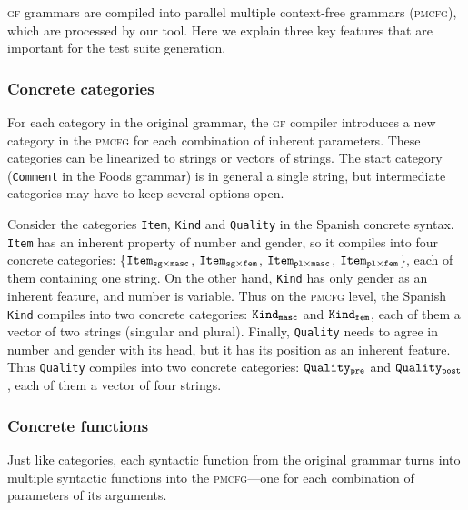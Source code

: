 \documentclass[runningheads]{llncs}
\def\t#1{\texttt{#1}}
\def\gf{\textsc{gf}}
\def\pmcfg{\textsc{pmcfg}}
\newcommand{\quality}[1]{${\tt Quality_{#1}}$}
\newcommand{\kind}[1]{${\tt Kind_{#1}}$}
\newcommand{\itemSpa}[2]{${\tt Item_{#1\times#2}}$}
\newcommand{\itemEng}[1]{${\tt Item_{#1}}$}
\begin{document}
\gf{} grammars are compiled into parallel multiple context-free
grammars (\pmcfg), which are processed by our tool. Here we explain
three key features that are important for the test suite generation.

\subsubsection{Concrete categories}

For each category in the original grammar, the \gf{} compiler
introduces a new category in the \pmcfg{} for each combination of
inherent parameters.  
These categories can be linearized to strings or vectors of
strings. The start category (\t{Comment} in the Foods grammar) is in
general a single string, but intermediate categories may have to keep
several options open. 

Consider the categories \t{Item}, \t{Kind} and \t{Quality} in the
Spanish concrete syntax. \t{Item} has an inherent property of number
and gender, so it compiles into four
concrete categories: \{\itemSpa{sg}{masc}, \itemSpa{sg}{fem},
\itemSpa{pl}{masc}, \itemSpa{pl}{fem}\}, each of them containing one string.
On the other hand, \t{Kind} has only gender as an inherent feature,
and number is variable. Thus on the \pmcfg{} level, the Spanish
\t{Kind} compiles into two concrete categories: \kind{masc} and
\kind{fem}, each of them a vector of two strings (singular and plural).
Finally, \t{Quality} needs to agree in number and gender
with its head, but it has its position as an inherent feature. 
Thus \t{Quality} compiles into two concrete categories: \quality{pre} and
\quality{post}, each of them a vector of four strings.

\subsubsection{Concrete functions}
Just like categories, each syntactic function from the original
grammar turns into multiple syntactic functions into the
\pmcfg{}---one for each combination of parameters of its arguments.
\end{document}

